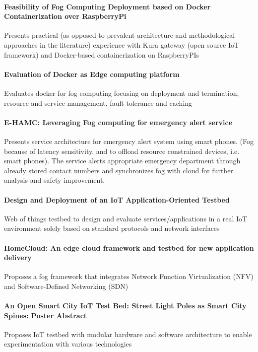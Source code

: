 \paragraph{Feasibility of Fog Computing Deployment based on Docker Containerization over RaspberryPi} \cite{bellavista_feasibility_2017}
Presents practical (as opposed to prevalent architecture and methodological approaches in the literature) experience with Kura gateway (open source IoT framework) and Docker-based containerization on RaspberryPIs

\paragraph{Evaluation of Docker as Edge computing platform}\cite{ismail_evaluation_2015}
Evaluates docker for fog computing focusing on deployment and termination, resource and service management, fault tolerance and caching

\paragraph{E-HAMC: Leveraging Fog computing for emergency alert service} \cite{7134091}
Presents service architecture for emergency alert system using smart phones. (Fog because of latency sensitivity, and to offload resource constrained devices, i.e. smart phones). The service alerts appropriate emergency department through already stored contact numbers and synchronizes fog with cloud for further analysis and safety improvement.

\paragraph{Design and Deployment of an IoT Application-Oriented Testbed}\cite{belli_design_2015}
Web of things testbed to design and evaluate services/applications in a real IoT environment solely based on standard protocols and network interfaces

\paragraph{HomeCloud: An edge cloud framework and testbed for new application delivery} \cite{pan_homecloud:_2016}
Proposes a fog framework that integrates Network Function Virtualization (NFV) and Software-Defined Networking (SDN)

\paragraph{An Open Smart City IoT Test Bed: Street Light Poles as Smart City Spines: Poster Abstract}\cite{amrutur_open_2017}
Proposes IoT testbed with modular hardware and software architecture to enable experimentation with various technologies

